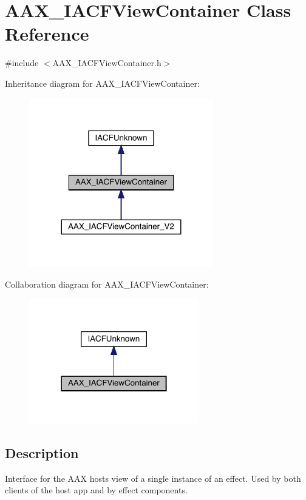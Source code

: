 \hypertarget{a01765}{}\section{A\+A\+X\+\_\+\+I\+A\+C\+F\+View\+Container Class Reference}
\label{a01765}


{\ttfamily \#include $<$A\+A\+X\+\_\+\+I\+A\+C\+F\+View\+Container.\+h$>$}



Inheritance diagram for A\+A\+X\+\_\+\+I\+A\+C\+F\+View\+Container\+:
\nopagebreak
\begin{figure}[H]
\begin{center}
\leavevmode
\includegraphics[width=227pt]{a01764}
\end{center}
\end{figure}


Collaboration diagram for A\+A\+X\+\_\+\+I\+A\+C\+F\+View\+Container\+:
\nopagebreak
\begin{figure}[H]
\begin{center}
\leavevmode
\includegraphics[width=209pt]{a01763}
\end{center}
\end{figure}


\subsection{Description}
Interface for the A\+AX host\textquotesingle{}s view of a single instance of an effect. Used by both clients of the host app and by effect components. 

